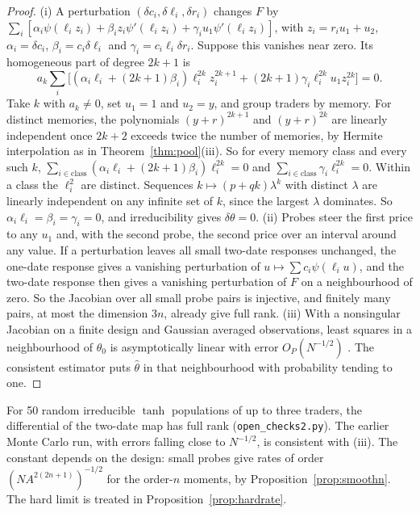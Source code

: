 \documentclass[12pt]{article}
\theoremstyle{definition}
\theoremstyle{remark}
\begin{document}
\begin{proof}
(i) A perturbation $(\delta c_i,\delta\ell_i,\delta r_i)$ changes $F$ by $\sum_i[\alpha_i\psi(\ell_iz_i)+\beta_iz_i\psi'(\ell_iz_i)+\gamma_iu_1\psi'(\ell_iz_i)]$, with $z_i=r_iu_1+u_2$, $\alpha_i=\delta c_i$, $\beta_i=c_i\delta\ell_i$ and $\gamma_i=c_i\ell_i\delta r_i$. Suppose this vanishes near zero. Its homogeneous part of degree $2k+1$ is
\[
a_k\sum_i\bigl[(\alpha_i\ell_i+(2k+1)\beta_i)\ell_i^{2k}z_i^{2k+1}+(2k+1)\gamma_i\ell_i^{2k}u_1z_i^{2k}\bigr]=0 .
\]
Take $k$ with $a_k\ne0$, set $u_1=1$ and $u_2=y$, and group traders by memory. For distinct memories, the polynomials $(y+r)^{2k+1}$ and $(y+r)^{2k}$ are linearly independent once $2k+2$ exceeds twice the number of memories, by Hermite interpolation as in Theorem~\ref{thm:pool}(iii). So for every memory class and every such $k$, $\sum_{i\in\text{class}}(\alpha_i\ell_i+(2k+1)\beta_i)\ell_i^{2k}=0$ and $\sum_{i\in\text{class}}\gamma_i\ell_i^{2k}=0$. Within a class the $\ell_i^2$ are distinct. Sequences $k\mapsto(p+qk)\lambda^k$ with distinct $\lambda$ are linearly independent on any infinite set of $k$, since the largest $\lambda$ dominates. So $\alpha_i\ell_i=\beta_i=\gamma_i=0$, and irreducibility gives $\delta\theta=0$.
(ii) Probes steer the first price to any $u_1$ and, with the second probe, the second price over an interval around any value. If a perturbation leaves all small two-date responses unchanged, the one-date response gives a vanishing perturbation of $u\mapsto\sum c_i\psi(\ell_iu)$, and the two-date response then gives a vanishing perturbation of $F$ on a neighbourhood of zero. So the Jacobian over all small probe pairs is injective, and finitely many pairs, at most the dimension $3n$, already give full rank.
(iii) With a nonsingular Jacobian on a finite design and Gaussian averaged observations, least squares in a neighbourhood of $\theta_0$ is asymptotically linear with error $O_P(N^{-1/2})$ \citep{vandervaart1998}. The consistent estimator puts $\hat\theta$ in that neighbourhood with probability tending to one.
\end{proof}

For 50 random irreducible $\tanh$ populations of up to three traders, the differential of the two-date map has full rank (\nolinkurl{open_checks2.py}). The earlier Monte Carlo run, with errors falling close to $N^{-1/2}$, is consistent with (iii). The constant depends on the design: small probes give rates of order $(NA^{2(2n+1)})^{-1/2}$ for the order-$n$ moments, by Proposition~\ref{prop:smoothn}. The hard limit is treated in Proposition~\ref{prop:hardrate}.
\end{document}
